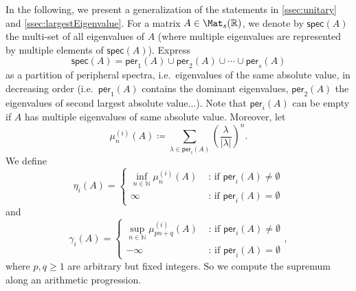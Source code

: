 In the following, we present a generalization of the statements in \cref{ssec:unitary} and \cref{ssec:largestEigenvalue}.
For a matrix $A\in \Mat_s(\mathbb R)$, we denote by $\mathsf{spec}(A)$ the multi-set of all eigenvalues of $A$ (where multiple eigenvalues are represented by multiple elements of $\mathsf{spec}(A)$). Express
$$\mathsf{spec}(A) = \mathsf{per}_1(A) \cup \mathsf{per}_2(A) \cup \cdots \cup \mathsf{per}_s(A)$$
as a partition of peripheral spectra, i.e.\ eigenvalues of the same absolute value, in decreasing order (i.e.\ $\mathsf{per}_1(A)$ contains the dominant eigenvalues, $\mathsf{per}_2(A)$ the eigenvalues of second largest absolute value...). Note that $\mathsf{per}_{i}(A)$ can be empty if $A$ has multiple eigenvalues of same absolute value.
Moreover, let
$$ \mu_n^{(i)}(A) \coloneqq \sum_{\lambda \in \mathsf{per}_i(A)} \left(\frac{\lambda}{|\lambda|}\right)^n.$$ 
We define
$$\eta_i(A) = \left\{\begin{array}{cl} \inf_{n \in \mathbb{N}} \mu^{(i)}_n(A) & \text{ : if } \mathsf{per}_i(A) \neq \emptyset \\ \infty & \text{ : if } \mathsf{per}_i(A) = \emptyset \end{array}\right.$$
and
$$\gamma_i(A) =  \left\{\begin{array}{cl} \sup_{n \in \mathbb{N}} \mu^{(i)}_{pn+q}(A) & \text{ : if } \mathsf{per}_i(A) \neq \emptyset \\ -\infty  & \text{ : if } \mathsf{per}_i(A) = \emptyset\end{array}\right.,$$ where $p,q\geqslant 1$ are arbitrary but fixed integers. So we compute the supremum  along an arithmetic progression.

